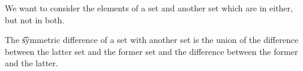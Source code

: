 

We want to consider the elements of a set and another set which are in either, but not in both.


The \t{symmetric difference} of a set with another set is the union of the difference between the latter set and the former set and the difference between the former and the latter.

\blankpage